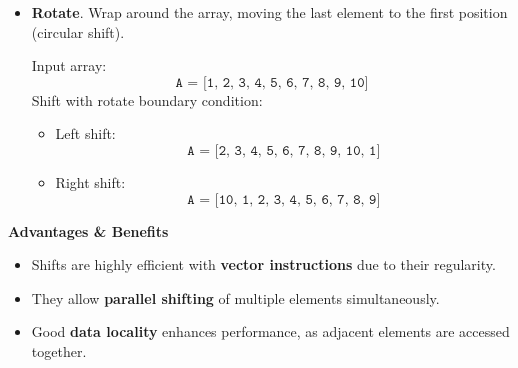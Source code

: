 \begin{itemize}[label=\textcolor{Green3}{}]
    \item \textcolor{Green3}{\textbf{Rotate}}. Wrap around the array, moving the last element to the first position (circular shift).
    \begin{examplebox}
        Input array:
        \begin{equation*}
            \texttt{A = [1, 2, 3, 4, 5, 6, 7, 8, 9, 10]}
        \end{equation*}
        Shift with rotate boundary condition:
        \begin{itemize}
            \item Left shift:
            \begin{equation*}
                \texttt{A = [2, 3, 4, 5, 6, 7, 8, 9, 10, 1]}
            \end{equation*}
            \item Right shift:
            \begin{equation*}
                \texttt{A = [10, 1, 2, 3, 4, 5, 6, 7, 8, 9]}
            \end{equation*}
        \end{itemize}
    \end{examplebox}
\end{itemize}

\highspace
\begin{flushleft}
    \textcolor{Green3}{ \textbf{Advantages \& Benefits}}
\end{flushleft}
\begin{itemize}
    \item Shifts are highly efficient with \textbf{vector instructions} due to their regularity.
    \item They allow \textbf{parallel shifting} of multiple elements simultaneously.
    \item Good \textbf{data locality} enhances performance, as adjacent elements are accessed together.
\end{itemize}